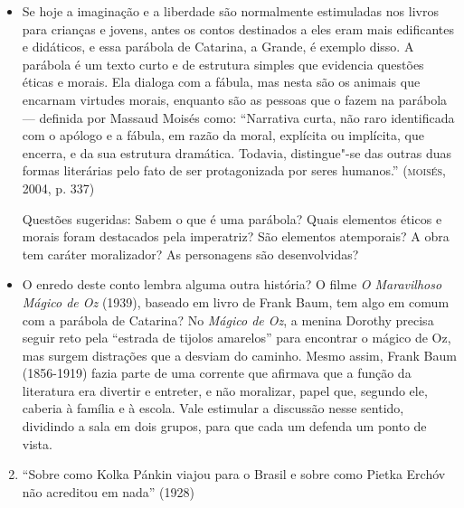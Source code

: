 \documentclass[11pt]{extarticle}
\begin{document}
\begin{itemize}
\item Se hoje a imaginação e a liberdade são normalmente estimuladas nos
livros para crianças e jovens, antes os contos destinados a eles eram
mais edificantes e didáticos, e essa parábola de Catarina, a Grande, é
exemplo disso. A parábola é um texto curto e de estrutura simples que
evidencia questões éticas e morais. Ela dialoga com a fábula, mas nesta
são os animais que encarnam virtudes morais, enquanto são as pessoas que o fazem
na parábola --- definida por Massaud Moisés como: ``Narrativa curta, não
raro identificada com o apólogo e a fábula, em razão da moral, explícita
ou implícita, que encerra, e da sua estrutura dramática. Todavia,
distingue"-se das outras duas formas literárias pelo fato de ser
protagonizada por seres humanos.'' (\textsc{moisés}, 2004, p. 337)

Questões sugeridas: Sabem o que é uma parábola? Quais elementos éticos e
morais foram destacados pela imperatriz? São elementos atemporais? A
obra tem caráter moralizador? As personagens são desenvolvidas?
\end{itemize}


\begin{itemize}
\item O enredo deste conto lembra alguma outra história? O filme \emph{O
Maravilhoso Mágico de Oz} (1939), baseado em livro de Frank Baum, tem
algo em comum com a parábola de Catarina? No \emph{Mágico de Oz}, a
menina Dorothy precisa seguir reto pela ``estrada de tijolos amarelos''
para encontrar o mágico de Oz, mas surgem distrações que a desviam do
caminho. Mesmo assim, Frank Baum (1856-1919) fazia parte de uma corrente
que afirmava que a função da literatura era divertir e entreter, e não
moralizar, papel que, segundo ele, caberia à família e à escola. Vale
estimular a discussão nesse sentido, dividindo a sala em dois grupos,
para que cada um defenda um ponto de vista.
\end{itemize}

\begin{enumerate}
\setcounter{enumi}{1}
\item ``Sobre como Kolka Pánkin viajou para o Brasil e sobre como
Pietka Erchóv não acreditou em nada'' (1928)
\end{enumerate}
\end{document}
